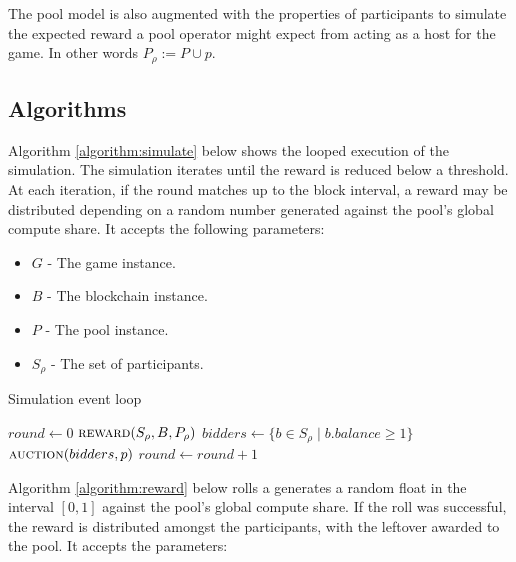 The pool model is also augmented with the properties of participants to simulate the expected reward a pool operator might expect from acting as a host for the game. In other words $P_\rho := P \cup p$.

\subsection{Algorithms}

Algorithm \ref{algorithm:simulate} below shows the looped execution of the simulation. The simulation iterates until the reward is reduced below a threshold. At each iteration, if the round matches up to the block interval, a reward may be distributed depending on a random number generated against the pool's global compute share. It accepts the following parameters:

\begin{itemize}
    \item $G$ - The game instance.
    \item $B$ - The blockchain instance.
    \item $P$ - The pool instance.
    \item $S_\rho$ - The set of participants.
\end{itemize}

\begin{algorithm}[H]
  \caption{Simulation event loop}
  \label{algorithm:simulate}
  \begin{algorithmic}[1]
        \State $round \gets 0$
                \State $\textsc{reward}(S_\rho, B, P_\rho)$ 
            \EndIf
            \State $bidders \gets \{ b \in S_\rho \mid b.balance \geq 1 \}$
                \State $\textsc{auction}(bidders, p)$ 
            \EndFor
            \State $round \gets round + 1$
        \EndWhile
    \EndProcedure
  \end{algorithmic}
\end{algorithm}

Algorithm \ref{algorithm:reward} below rolls a generates a random float in the interval $[0, 1]$ against the pool's global compute share. If the roll was successful, the reward is distributed amongst the participants, with the leftover awarded to the pool. It accepts the parameters:

